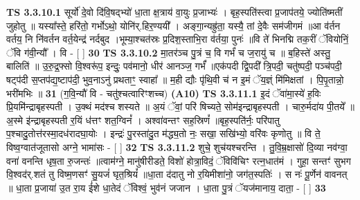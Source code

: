 \documentclass[17pt]{extarticle}
\begin{document}
                                        \textbf{ TS 3.3.10.1} \newline
                  सूर्यो॑ दे॒वो दि॑वि॒षद्भ्यो॑ धा॒ता क्ष॒त्राय॑ वा॒युः प्र॒जाभ्यः॑ । बृह॒स्पति॑स्त्वा प्र॒जाप॑तये॒ ज्योति॑ष्मतीं जुहोतु ॥ यस्या᳚स्ते॒ हरि॑तो॒ गर्भोऽथो॒ योनि॑र्.हिर॒ण्ययी᳚ । अङ्गा॒न्यह्रु॑ता॒ यस्यै॒ तां दे॒वैः सम॑जीगमं ॥आ व॑र्तन वर्तय॒ नि नि॑वर्तन वर्त॒येन्द्र॑ नर्दबुद ।भूम्या॒श्चत॑स्रः प्र॒दिश॒स्ताभि॒रा व॑र्तया॒ पुनः॑ ॥वि ते॑ भिनद्मि तक॒रीं ॅवियोनिं॒ ॅवि ग॑वी॒न्यौ᳚ । वि - [  ] \textbf{  30} \newline
                  \newline
                                \textbf{ TS 3.3.10.2} \newline
                  मा॒तर॑ञ्च पु॒त्रं च॒ वि गर्भं॑ च ज॒रायु॑ च ॥ ब॒हिस्ते॑ अस्तु॒ बालिति॑ ॥ उ॒रु॒द्र॒फ्सो वि॒श्वरू॑प॒ इन्दुः॒ पव॑मानो॒ धीर॑ आनञ्ज॒ गर्भं᳚ ॥एक॑पदी द्वि॒पदी᳚ त्रि॒पदी॒ चतु॑ष्पदी॒ पञ्च॑पदी॒ षट्प॑दी स॒प्तप॑द्य॒ष्टाप॑दी॒ भुव॒नाऽनु॑ प्रथताꣳ॒॒ स्वाहा᳚ ॥ म॒ही द्यौः पृ॑थि॒वी च॑ न इ॒मं ॅय॒ज्ञ्ं मि॑मिक्षतां । पि॒पृ॒तान्नो॒ भरी॑मभिः ॥ \textbf{  31} \newline
                  \newline
                      (ग॒वि॒न्यौ॑ वि - चतु॑श्चत्वारिꣳशच्च)  \textbf{(A10)} \newline \newline
                                        \textbf{ TS 3.3.11.1} \newline
                  इ॒दं ॅवा॑मा॒स्ये॑ ह॒विः प्रि॒यमि॑न्द्राबृहस्पती । उ॒क्थं मद॑श्च शस्यते ॥ अ॒यं ॅवां॒ परि॑ षिच्यते॒ सोम॑इन्द्राबृहस्पती । चारु॒र्मदा॑य पी॒तये᳚ ॥ अ॒स्मे इ॑न्द्राबृहस्पती र॒यिं ध॑त्तꣳ शत॒ग्विनं᳚ । अश्वा॑वन्तꣳ सह॒स्रिणं᳚ ॥बृह॒स्पति॑र्नः॒ परि॑पातु प॒श्चादु॒तोत्त॑रस्मा॒दध॑रादघा॒योः । इन्द्रः॑ पु॒रस्ता॑दु॒त म॑द्ध्य॒तो नः॒ सखा॒ सखि॑भ्यो॒ वरि॑वः कृणोतु ॥ वि ते॒ विष्व॒ग्वात॑जूतासो अग्ने॒ भामा॑सः - [  ] \textbf{  32} \newline
                  \newline
                                \textbf{ TS 3.3.11.2} \newline
                  शुचे॒ शुच॑यश्चरन्ति । तु॒वि॒म्र॒क्षासो॑ दि॒व्या नव॑ग्वा॒ वना॑ वनन्ति धृष॒ता रु॒जन्तः॑ ॥त्वाम॑ग्ने॒ मानु॑षीरीडते॒ विशो॑ होत्रा॒विदं॒ ॅविवि॑चिꣳ रत्न॒धात॑मं । गुहा॒ सन्तꣳ॑ सुभग वि॒श्वद॑र्.शतं तु विष्म॒णसꣳ॑ सु॒यजं॑ घृत॒श्रियं᳚ ॥धा॒ता द॑दातु नो र॒यिमीशा॑नो॒ जग॑त॒स्पतिः॑ । स नः॑ पू॒र्णेन॑ वावनत् ॥ धा॒ता प्र॒जाया॑ उ॒त रा॒य ई॑शे धा॒तेदं ॅविश्वं॒ भुव॑नं जजान । धा॒ता पु॒त्रं ॅयज॑मानाय॒ दाता॒ - [  ] \textbf{  33} \newline
\end{document}
